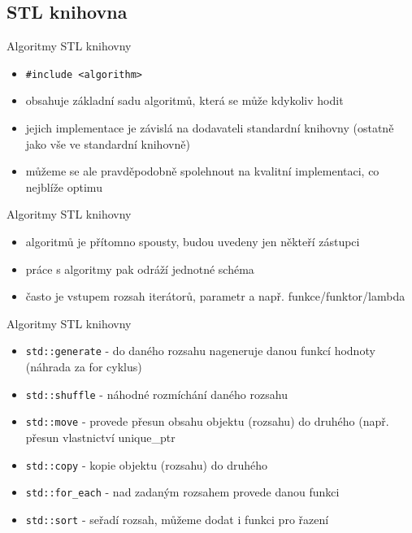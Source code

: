 \documentclass{beamer}
\begin{document}
\subsection{STL knihovna}

\begin{xframe}{Algoritmy STL knihovny}
	\begin{itemize}
		\item \texttt{\#include <algorithm>}
		\item obsahuje základní sadu algoritmů, která se může kdykoliv hodit
		\item jejich implementace je závislá na dodavateli standardní knihovny (ostatně jako vše ve standardní knihovně)
		\item můžeme se ale pravděpodobně spolehnout na kvalitní implementaci, co nejblíže optimu
	\end{itemize}
\end{xframe}

\begin{xframe}{Algoritmy STL knihovny}
	\begin{itemize}
		\item algoritmů je přítomno spousty, budou uvedeny jen někteří zástupci
		\item práce s algoritmy pak odráží jednotné schéma
		\item často je vstupem rozsah iterátorů, parametr a např. funkce/funktor/lambda
	\end{itemize}
\end{xframe}

\begin{xframe}{Algoritmy STL knihovny}
	\begin{itemize}
		\item \texttt{std::generate} - do daného rozsahu nageneruje danou funkcí hodnoty (náhrada za for cyklus)
		\item \texttt{std::shuffle} - náhodné rozmíchání daného rozsahu
		\item \texttt{std::move} - provede přesun obsahu objektu (rozsahu) do druhého (např. přesun vlastnictví unique\_ptr
		\item \texttt{std::copy} - kopie objektu (rozsahu) do druhého
		\item \texttt{std::for\_each} - nad zadaným rozsahem provede danou funkci
		\item \texttt{std::sort} - seřadí rozsah, můžeme dodat i funkci pro řazení
	\end{itemize}
\end{xframe}
\end{document}
